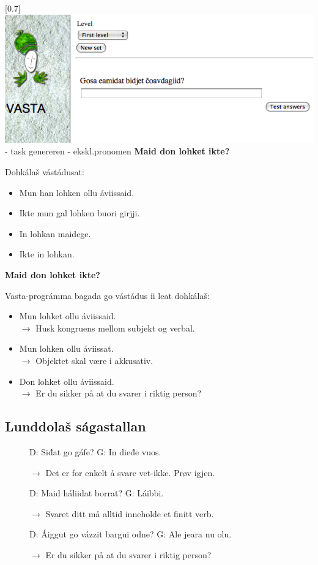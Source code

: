 \documentclass[a4paper,14pt]{article}
\begin{document}
\scalebox{0.7}[0.7]{\includegraphics{presentation/img/vasta.png}} \\

- task genereren
- ekskl.pronomen
\textbf{Maid don lohket ikte?} 

Dohkálaš vástádusat:
\begin{itemize}
\item Mun han lohken ollu áviissaid. 
\item Ikte mun gal lohken buori girjji. 
\item In lohkan maidege. 
\item Ikte in lohkan.
\end{itemize}

\textbf{Maid don lohket ikte?} 

Vasta-prográmma bagada go vástádus ii leat dohkálaš:
\begin{itemize}
\item Mun lohket ollu áviissaid. \\ $\rightarrow$ Husk kongruens mellom subjekt og verbal.  
\item Mun lohken ollu áviissat. \\ $\rightarrow$ Objektet skal være i akkusativ. 
\item Don lohket ollu áviissaid. \\ $\rightarrow$ Er du sikker på at du svarer i riktig person?  
\end{itemize}

\subsection{Lunddolaš ságastallan}

\begin{description}
\item [ ] D: Siđat go gáfe?   G: In dieđe vuos.   
\item [ ] $\rightarrow$ Det er for enkelt å svare vet-ikke. Prøv igjen.   
\item [ ] D: Maid háliidat borrat?   G: Láibbi.   
\item [ ] $\rightarrow$ Svaret ditt må alltid inneholde et finitt verb.   
\item [ ] D: Áiggut go vázzit bargui odne?   G: Ale jeara nu olu.   
\item [ ] $\rightarrow$ Er du sikker på at du svarer i riktig person?
\end{description} 
\end{document}
